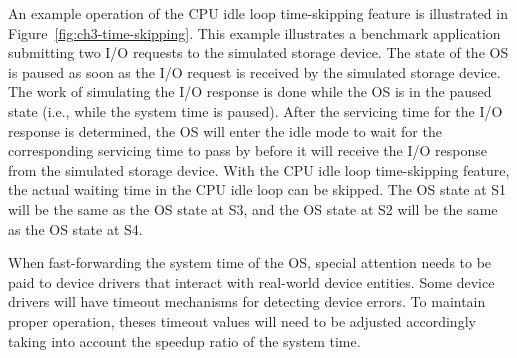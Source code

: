 An example operation of the CPU idle loop time-skipping feature is illustrated in Figure~\ref{fig:ch3-time-skipping}. This example illustrates a benchmark application submitting two I/O requests to the simulated storage device. The state of the OS is paused as soon as the I/O request is received by the simulated storage device. The work of simulating the I/O response is done while the OS is in the paused state (i.e., while the system time is paused). After the servicing time for the I/O response is determined, the OS will enter the idle mode to wait for the corresponding servicing time to pass by before it will receive the I/O response from the simulated storage device. With the CPU idle loop time-skipping feature, the actual waiting time in the CPU idle loop can be skipped. The OS state at S1 will be the same as the OS state at S3, and the OS state at S2 will be the same as the OS state at S4.


When fast-forwarding the system time of the OS, special attention needs to be paid to device drivers that interact with real-world device entities. Some device drivers will have timeout mechanisms for detecting device errors. To maintain proper operation, theses timeout values will need to be adjusted accordingly taking into account the speedup ratio of the system time.